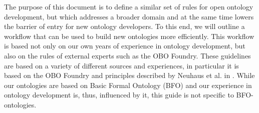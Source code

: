 The purpose of this document is to define a similar set of rules for open ontology development, but which addresses a broader domain and at the same time lowers the barrier of entry for new ontology developers. To this end, we will outline a workflow that can be used to build new ontologies more efficiently. This workflow is based not only on our own years of experience in ontology development, but also on the rules of external experts such as the OBO Foundry. These guidelines are based on a variety of different sources and experiences, in particular it is based on the OBO Foundry \cite{smith2007obo} and principles described by Neuhaus et al. in \cite{Neuhaus2022OntologyDI, neuhaus2018ontology}. While our ontologies are based on  Basic Formal Ontology (BFO) \cite{bfo-book} and our experience in ontology development is, thus, influenced by it, this guide is not specific to BFO-ontologies. 
%
%
%
%
%
%
